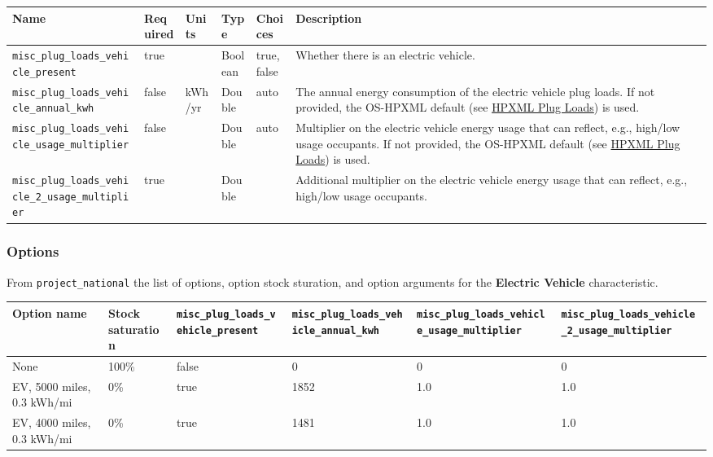 \begin{longtable}[]{@{}llllll@{}}
\toprule\noalign{}
Name & Required & Units & Type & Choices & Description \\
\midrule\noalign{}
\endhead
\bottomrule\noalign{}
\endlastfoot
\texttt{misc\_plug\_loads\_vehicle\_present} & true & & Boolean & true,
false & Whether there is an electric vehicle. \\
\texttt{misc\_plug\_loads\_vehicle\_annual\_kwh} & false & kWh/yr &
Double & auto & The annual energy consumption of the electric vehicle
plug loads. If not provided, the OS-HPXML default (see
\href{https://openstudio-hpxml.readthedocs.io/en/v1.7.0/workflow_inputs.html\#hpxml-plug-loads}{HPXML
Plug Loads}) is used. \\
\texttt{misc\_plug\_loads\_vehicle\_usage\_multiplier} & false & &
Double & auto & Multiplier on the electric vehicle energy usage that can
reflect, e.g., high/low usage occupants. If not provided, the OS-HPXML
default (see
\href{https://openstudio-hpxml.readthedocs.io/en/v1.7.0/workflow_inputs.html\#hpxml-plug-loads}{HPXML
Plug Loads}) is used. \\
\texttt{misc\_plug\_loads\_vehicle\_2\_usage\_multiplier} & true & &
Double & & Additional multiplier on the electric vehicle energy usage
that can reflect, e.g., high/low usage occupants. \\
\end{longtable}

\subsubsection{Options}\label{options-39}

From \texttt{project\_national} the list of options, option stock
sturation, and option arguments for the \textbf{Electric Vehicle}
characteristic.

\begin{longtable}[]{@{}llllll@{}}
\toprule\noalign{}
Option name & Stock saturation &
\texttt{misc\_plug\_loads\_vehicle\_present} &
\texttt{misc\_plug\_loads\_vehicle\_annual\_kwh} &
\texttt{misc\_plug\_loads\_vehicle\_usage\_multiplier} &
\texttt{misc\_plug\_loads\_vehicle\_2\_usage\_multiplier} \\
\midrule\noalign{}
\endhead
\bottomrule\noalign{}
\endlastfoot
None & 100\% & false & 0 & 0 & 0 \\
EV, 5000 miles, 0.3 kWh/mi & 0\% & true & 1852 & 1.0 & 1.0 \\
EV, 4000 miles, 0.3 kWh/mi & 0\% & true & 1481 & 1.0 & 1.0 \\
\end{longtable}

